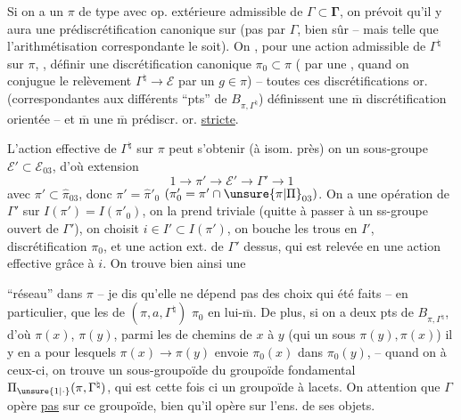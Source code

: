 

Si on a un $\pi$  de type  avec op. extérieure admissible de $\Gamma\subset\boldsymbol{\Gamma}$, on prévoit qu'il y aura une prédiscrétification  canonique sur  (pas  par $\Gamma$, bien sûr \unsure{!|)} -- mais telle que l'arithmétisation correspondante le soit). On  , pour une action  admissible de $\Gamma^{\natural}$ sur $\pi$, , définir une discrétification   canonique $\pi_0\subset\pi$ ( par une , quand on conjugue  le relèvement $\Gamma^{\natural}\to\mathcal E$ par un $g\in\pi$) -- toutes ces discrétifications or. (correspondantes aux différents ``pts'' de $B_{\pi,\Gamma^{\natural}}$) définissent une $\overline{\mathrm m}$ discrétification orientée -- et $\overline{\mathrm m}$ une $\overline{\mathrm m}$ prédiscr. or. \uline{stricte}.

L'action effective de $\Gamma^{\natural}$ sur $\pi$ peut s'obtenir (à isom. près)  on  un sous-groupe  $\mathcal E'\subset\mathcal E_{03}$, d'où extension
\[
1\to\pi'\to\mathcal E'\to\Gamma'\to1
\]
avec $\pi'\subset\widehat{\pi}_{03}$, donc $\pi'=\widehat{\pi}'_0$ $(\pi'_0=\pi'\cap\unsure{\pi|\Pi}_{03})$. On a une opération de $\Gamma'$ sur $I(\pi')=I(\pi'_0)$, on la prend triviale (quitte à passer à un ss-groupe ouvert de $\Gamma'$), on choisit $i\in I'\subset I(\pi')$, on bouche les trous en $I'$,   discrétification  $\pi_0$, et une action ext. de $\Gamma'$ dessus, qui est relevée en une action effective grâce à $i$. On trouve bien ainsi une



``réseau''  dans $\pi$ -- je dis qu'elle ne dépend pas des choix qui  été faits -- en particulier, que les  de $(\pi,a,\Gamma^{\natural})$  $\pi_0$ en lui-$\overline{\mathrm m}$. De plus, si on a deux pts  de $B_{\pi,\Gamma^{\natural}}$, d'où $\pi(x)$, $\pi(y)$, parmi les  de chemins de $x$ à $y$ (qui  un  sous $\pi(y),\pi(x)$) il y en a pour lesquels  $\pi(x)\to\pi(y)$ envoie $\pi_0(x)$ dans $\pi_0(y)$, -- quand on   à ceux-ci, on trouve un sous-groupoïde du groupoïde fondamental $\Pi_{\unsure{1|\cdot}}(\pi,\Gamma^{\natural})$, qui est cette fois ci un groupoïde \uline{} à lacets. On  attention que $\Gamma$ opère \uline{pas} sur ce groupoïde, bien qu'il opère sur l'ens. de ses objets.

